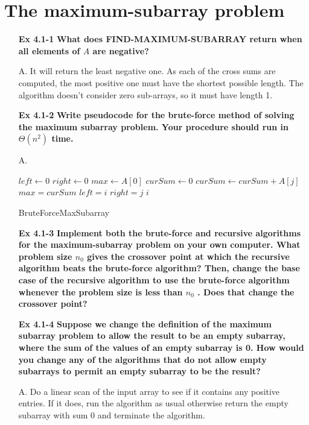 \documentclass[fontsize=12pt,paper=a4,open=any]{book}
\begin{document}
\section{The maximum-subarray problem}
\begin{enumerate}
	\item[\textbf{Ex 4.1-1}]
		\textbf{What does FIND-MAXIMUM-SUBARRAY return when all elements of $A$ are negative?}
	\item[A.]
	It will return the least negative one. As each of the cross sums are computed, the most positive one must have the shortest possible length. The algorithm doesn’t consider zero sub-arrays, so it must have length 1.
	
	\item[\textbf{Ex 4.1-2}]
		\textbf{Write pseudocode for the brute-force method of solving the maximum subarray problem. Your procedure should run in $\Theta(n^2)$ time.}
	\item[A.]		
		\begin{algorithm}[H]

			$left \longleftarrow 0$\;
			$right \longleftarrow 0$\;
			$max \longleftarrow A[0]$\;
			{
				$curSum \longleftarrow 0$\;
				{
					$curSum \longleftarrow curSum + A[j]$\;
					{
						$max = curSum$\;
						$left = i$\;
						$right = j$\;
					}
				}
			}
			\Return $i$

			\caption{BruteForceMaxSubarray}
		\end{algorithm}
		
	\item[\textbf{Ex 4.1-3}]
		\textbf{Implement both the brute-force and recursive algorithms for the maximum-subarray problem on your own computer. What problem size $n_0$ gives the crossover point at which the recursive algorithm beats the brute-force algorithm? Then, change the base case of the recursive algorithm to use the brute-force algorithm whenever the problem size is less than $n_0$ . Does that change the crossover point?}
		
	\item[\textbf{Ex 4.1-4}]
		\textbf{Suppose we change the definition of the maximum subarray problem to allow the result to be an empty subarray, where the sum of the values of an empty subarray is 0. How would you change any of the algorithms that do not allow empty subarrays to permit an empty subarray to be the result?}
	\item[A.]
	Do a linear scan of the input array to see if it contains any positive entries. If it does, run the algorithm as usual otherwise return the empty subarray with sum 0 and terminate the algorithm.
		

\end{enumerate}
\end{document}
